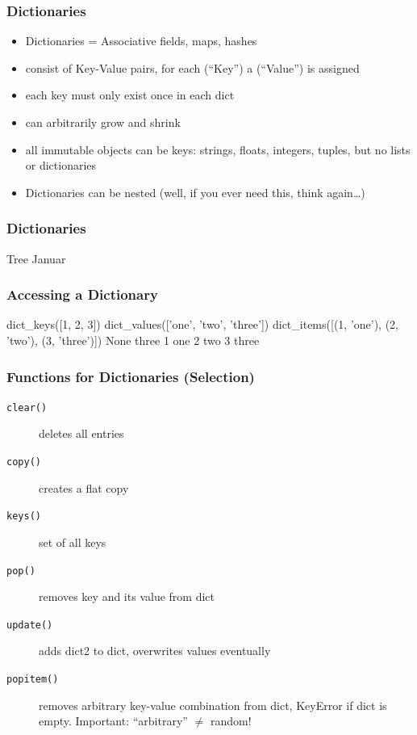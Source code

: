 \documentclass[ngerman]{beamer}
\newcommand{\ta}[1]{\textattachfile[color=1 0 0]{#1}{Code}}
\newcommand{\pypy}[2]{}
\begin{document}
\begin{frame}
\frametitle{Dictionaries}

\begin{itemize}
\item Dictionaries = Associative fields, maps, hashes
\item consist of Key-Value pairs, for each (\enquote{Key}) a (\enquote{Value}) is assigned
\item each key must only exist once in each dict
\item can arbitrarily grow and shrink
\item all immutable objects can be keys: strings, floats, integers, tuples, but no lists or dictionaries
\item Dictionaries can be nested (well, if you ever need this, think again\ldots)
\end{itemize}
\end{frame}

\begin{frame}[containsverbatim]
\frametitle{Dictionaries}

\pypy{dict-01.py}{Codes/dict-01.py}

\begin{ausgabe}
Tree
Januar
\end{ausgabe}

\end{frame}


\begin{frame}[containsverbatim]
\frametitle{Accessing a Dictionary}

\vspace*{-0.5em}\pypy{dict-04.py}{Codes/dict-04.py}

\vspace*{-0.5em}\begin{ausgabe}
dict_keys([1, 2, 3])
dict_values(['one', 'two', 'three'])
dict_items([(1, 'one'), (2, 'two'), (3, 'three')])
None
three
1 one
2 two
3 three
\end{ausgabe}

\end{frame}



\begin{frame}[containsverbatim]
\frametitle{Functions for Dictionaries (Selection)}

\begin{description}
\item[\texttt{clear()}] deletes all entries
\item[\texttt{copy()}] creates a flat copy
\item[\texttt{keys()}] set of all keys
\item[\texttt{pop()}] removes key and its value from dict
\item[\texttt{update()}] adds dict2 to dict, overwrites values eventually
\item[\texttt{popitem()}] removes arbitrary key-value combination from dict, KeyError if dict is empty. Important: \enquote{arbitrary} $\not=$ {random}!
\end{description}

\end{frame}
\end{document}
